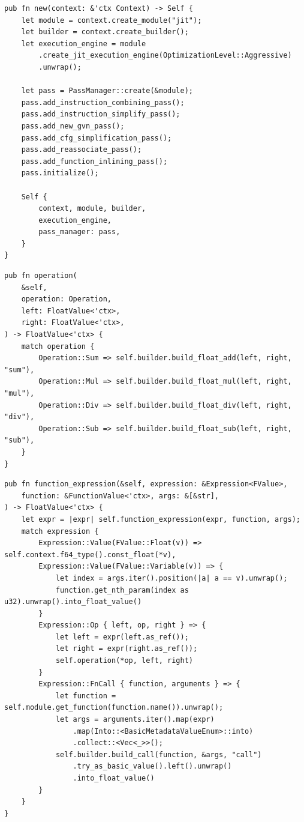 \begin{frame}[fragile]
    \begin{verbatim}
pub fn new(context: &'ctx Context) -> Self {
    let module = context.create_module("jit");
    let builder = context.create_builder();
    let execution_engine = module
        .create_jit_execution_engine(OptimizationLevel::Aggressive)
        .unwrap();

    let pass = PassManager::create(&module);
    pass.add_instruction_combining_pass();
    pass.add_instruction_simplify_pass();
    pass.add_new_gvn_pass();
    pass.add_cfg_simplification_pass();
    pass.add_reassociate_pass();
    pass.add_function_inlining_pass();
    pass.initialize();

    Self {
        context, module, builder,
        execution_engine,
        pass_manager: pass,
    }
}
    \end{verbatim}
\end{frame}

\begin{frame}[fragile]
    \begin{verbatim}
pub fn operation(
    &self,
    operation: Operation,
    left: FloatValue<'ctx>,
    right: FloatValue<'ctx>,
) -> FloatValue<'ctx> {
    match operation {
        Operation::Sum => self.builder.build_float_add(left, right, "sum"),
        Operation::Mul => self.builder.build_float_mul(left, right, "mul"),
        Operation::Div => self.builder.build_float_div(left, right, "div"),
        Operation::Sub => self.builder.build_float_sub(left, right, "sub"),
    }
}
    \end{verbatim}
\end{frame}

\begin{frame}[fragile]
    \begin{verbatim}
pub fn function_expression(&self, expression: &Expression<FValue>,
    function: &FunctionValue<'ctx>, args: &[&str],
) -> FloatValue<'ctx> {
    let expr = |expr| self.function_expression(expr, function, args);
    match expression {
        Expression::Value(FValue::Float(v)) => self.context.f64_type().const_float(*v),
        Expression::Value(FValue::Variable(v)) => {
            let index = args.iter().position(|a| a == v).unwrap();
            function.get_nth_param(index as u32).unwrap().into_float_value()
        }
        Expression::Op { left, op, right } => {
            let left = expr(left.as_ref());
            let right = expr(right.as_ref());
            self.operation(*op, left, right)
        }
        Expression::FnCall { function, arguments } => {
            let function = self.module.get_function(function.name()).unwrap();
            let args = arguments.iter().map(expr)
                .map(Into::<BasicMetadataValueEnum>::into)
                .collect::<Vec<_>>();
            self.builder.build_call(function, &args, "call")
                .try_as_basic_value().left().unwrap()
                .into_float_value()
        }
    }
}
    \end{verbatim}
\end{frame}

